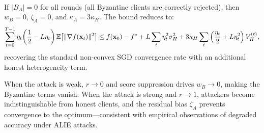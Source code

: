 \documentclass[../main]{subfiles}
\begin{document}
\begin{corollary}
\hfill \\\label{cor:perfect}
If $|B_A| = 0$ for all rounds (all Byzantine clients are correctly rejected),
then $w_B = 0$, $\zeta_A = 0$, and $\kappa_A = 3\kappa_H$. The bound reduces to:
\[
    \sum_{t=0}^{T-1} \eta_t\!\left(\frac{1}{2} - L\eta_t\right) \mathbb{E}\!\left[\|\nabla f(\mathbf{x}_t)\|^2\right]
    \leq f(\mathbf{x}_0) - f^*
    + L\sum_{t}\eta_t^2\sigma_H^2
    + 3\kappa_H \sum_{t}\left(\frac{\eta_t}{2} + L\eta_t^2\right) V_H^{(t)},
\]
recovering the standard non-convex SGD convergence rate with an additional honest heterogeneity term.
\end{corollary}

\begin{remark}
When the attack is weak, $r \to 0$ and score suppression drives $w_B \to 0$,
making the Byzantine terms vanish. When the attack is strong and $r \to 1$,
attackers become indistinguishable from honest clients, and the residual bias
$\zeta_A$ prevents convergence to the optimum---consistent with empirical
observations of degraded accuracy under ALIE attacks.
\end{remark}
\end{document}
